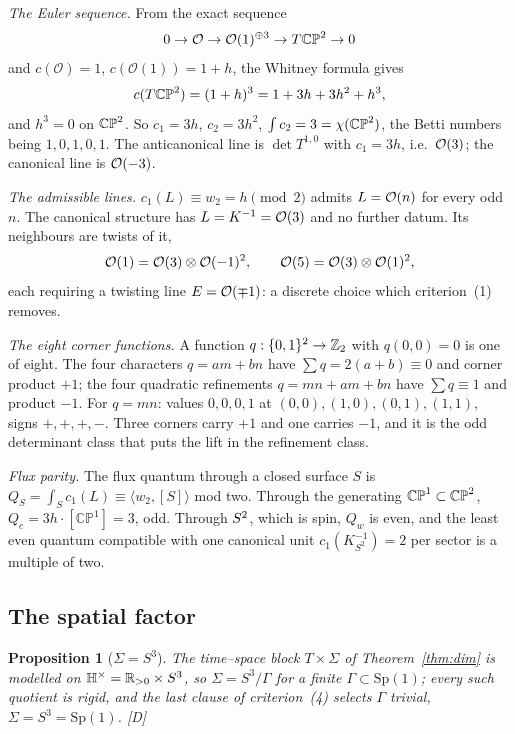 \documentclass[11pt,a4paper]{article}
\theoremstyle{plain}
\newtheorem{proposition}[theorem]{Proposition}
\theoremstyle{definition}
\theoremstyle{remark}
\newcommand{\Hquat}{\mathbb{H}}
\newcommand{\rigD}{[\textup{D}]}
\begin{document}
\emph{The Euler sequence.} From the exact sequence
\[
0\to\mathcal{O}\to\mathcal{O}(1)^{\oplus3}\to T\mathbb{CP}^2\to0
\]
and $c(\mathcal{O})=1$, $c(\mathcal{O}(1))=1+h$, the Whitney formula gives
\[
c(T\mathbb{CP}^2)=(1+h)^{3}=1+3h+3h^{2}+h^{3},
\]
and $h^{3}=0$ on $\mathbb{CP}^2$. So $c_{1}=3h$, $c_{2}=3h^{2}$, $\int c_{2}=3=\chi(\mathbb{CP}^2)$, the Betti numbers being $1,0,1,0,1$. The anticanonical line is $\det T^{1,0}$ with $c_{1}=3h$, i.e.\ $\mathcal{O}(3)$; the canonical line is $\mathcal{O}(-3)$.

\emph{The admissible lines.} $c_{1}(L)\equiv w_{2}=h\pmod2$ admits $L=\mathcal{O}(n)$ for every odd $n$. The canonical structure has $L=K^{-1}=\mathcal{O}(3)$ and no further datum. Its neighbours are twists of it,
\[
\mathcal{O}(1)=\mathcal{O}(3)\otimes\mathcal{O}(-1)^{2},\qquad \mathcal{O}(5)=\mathcal{O}(3)\otimes\mathcal{O}(1)^{2},
\]
each requiring a twisting line $E=\mathcal{O}(\mp1)$: a discrete choice which criterion~(1) removes.

\emph{The eight corner functions.} A function $q:\{0,1\}^{2}\to\mathbb{Z}_{2}$ with $q(0,0)=0$ is one of eight. The four characters $q=am+bn$ have $\sum q=2(a+b)\equiv0$ and corner product $+1$; the four quadratic refinements $q=mn+am+bn$ have $\sum q\equiv1$ and product $-1$. For $q=mn$: values $0,0,0,1$ at $(0,0),(1,0),(0,1),(1,1)$, signs $+,+,+,-$. Three corners carry $+1$ and one carries $-1$, and it is the odd determinant class that puts the lift in the refinement class.

\emph{Flux parity.} The flux quantum through a closed surface $S$ is $Q_{S}=\int_{S}c_{1}(L)\equiv\langle w_{2},[S]\rangle$ mod two. Through the generating $\mathbb{CP}^{1}\subset\mathbb{CP}^2$, $Q_{c}=3h\cdot[\mathbb{CP}^{1}]=3$, odd. Through $S^2$, which is spin, $Q_{w}$ is even, and the least even quantum compatible with one canonical unit $c_{1}(K^{-1}_{S^{2}})=2$ per sector is a multiple of two.

\subsection{The spatial factor}

\begin{proposition}[$\Sigma=S^{3}$]\label{prop:S3}
The time--space block $T\times\Sigma$ of Theorem~\ref{thm:dim} is modelled on $\Hquat^{\times}=\R_{>0}\times S^{3}$, so $\Sigma=S^{3}/\Gamma$ for a finite $\Gamma\subset\mathrm{Sp}(1)$; every such quotient is rigid, and the last clause of criterion~(4) selects $\Gamma$ trivial, $\Sigma=S^{3}=\mathrm{Sp}(1)$. \rigD
\end{proposition}
\end{document}
